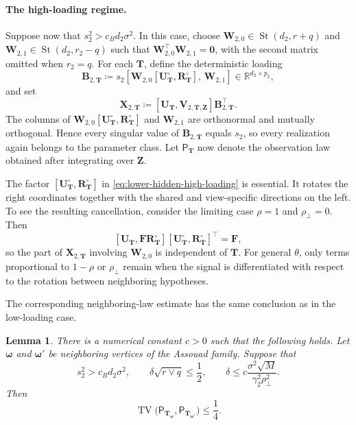 \documentclass[11pt]{article}
\newtheorem{lemma}{Lemma}
\newcommand{\trans}{\top}
\begin{document}
\paragraph{The high-loading regime.}
Suppose now that $s_2^2>c_Bd_2\sigma^2$.  In this case, choose
$\bm W_{2,0}\in\operatorname{St}(d_2,r+q)$ and
$\bm W_{2,1}\in\operatorname{St}(d_2,r_2-q)$ such that
$\bm W_{2,0}^\trans\bm W_{2,1}=\bm0$, with the second matrix omitted when
$r_2=q$.  For each $\bm T$, define the deterministic loading
\begin{equation}
\label{eq:lower-hidden-high-loading}
  \bm B_{2,\bm T}
  \coloneqq
  s_2
  \left[
    \bm W_{2,0}
    [\bm U_{\bm T}^{\circ},\bm R_{\bm T}^{\circ}],
    \,
    \bm W_{2,1}
  \right]
  \in\mathbb R^{d_2\times p_2},
\end{equation}
and set
\begin{equation}
\label{eq:lower-hidden-high-signal}
  \bm X_{2,\bm T}
  \coloneqq
  [\bm U_{\bm T},\bm V_{2,\bm T,\bm Z}]
  \bm B_{2,\bm T}^\trans.
\end{equation}
The columns of
$\bm W_{2,0}[\bm U_{\bm T}^{\circ},\bm R_{\bm T}^{\circ}]$ and
$\bm W_{2,1}$ are orthonormal and mutually orthogonal.  Hence every
singular value of $\bm B_{2,\bm T}$ equals $s_2$, so every realization
again belongs to the parameter class.  Let $\mathsf P_{\bm T}$ now denote
the observation law obtained after integrating over $\bm Z$.

The factor
$[\bm U_{\bm T}^{\circ},\bm R_{\bm T}^{\circ}]$ in
\cref{eq:lower-hidden-high-loading} is essential.  It rotates the right
coordinates together with the shared and view-specific directions on the
left.  To see the resulting cancellation, consider the limiting case
$\rho=1$ and $\rho_\perp=0$.  Then
\[
  [\bm U_{\bm T},
    \bm F\bm R_{\bm T}^{\circ}]
  [\bm U_{\bm T}^{\circ},
    \bm R_{\bm T}^{\circ}]^\trans
  =
  \bm F,
\]
so the part of $\bm X_{2,\bm T}$ involving $\bm W_{2,0}$ is independent
of $\bm T$.  For general $\theta$, only terms proportional to
$1-\rho$ or $\rho_\perp$ remain when the signal is differentiated with
respect to the rotation between neighboring hypotheses.

The corresponding neighboring-law estimate has the same conclusion as in
the low-loading case.

\begin{lemma}
\label{lem:lower-hidden-high-edge}
There is a numerical constant $c>0$ such that the following holds.  Let
$\bm\omega$ and $\bm\omega'$ be neighboring vertices of the Assouad family.
Suppose that
\[
  s_2^2>c_Bd_2\sigma^2,
  \qquad
  \delta\sqrt{r\vee q}\le\frac12,
  \qquad
  \delta
  \le
  c\frac{\sigma^2\sqrt M}
          {\gamma_2^2\rho_\perp^2}.
\]
Then
\[
  \operatorname{TV}\bigl(
    \mathsf P_{\bm T_{\bm\omega}},
    \mathsf P_{\bm T_{\bm\omega'}}
  \bigr)
  \le\frac14.
\]
\end{lemma}
\end{document}
